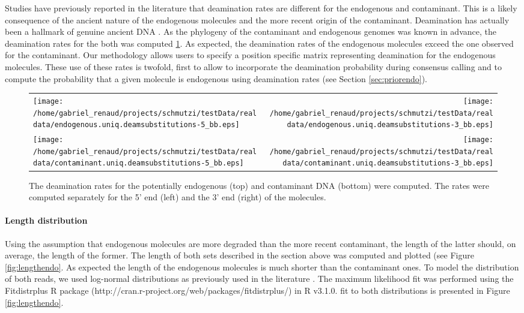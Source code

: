 \documentclass[a4paper,12pt]{article}
\begin{document}
\begin{itemize}
\begin{itemize}
Studies have previously reported in the literature \cite{meyer2013mitochondrial} that deamination rates are different for the endogenous and contaminant. This is a likely consequence of the ancient nature of the endogenous molecules and the more recent origin of the contaminant. Deamination has actually been a hallmark of genuine ancient DNA \cite{cooper2000ancient}. As the phylogeny of the contaminant and endogenous genomes was known in advance, the deamination rates for the both was computed \ref{fig:deaminationendo}. As expected, the deamination rates of the endogenous molecules exceed the one observed for the contaminant. Our methodology allows users to specify a position specific matrix representing deamination for the endogenous molecules. These use of these rates is twofold, first to allow to incorporate the deamination probability during consensus calling and to compute the probability that a given molecule is endogenous using deamination rates (see Section \ref{sec:priorendo}). 

\begin{figure}[H]
\centering
\begin{tabular}{lr}
  \texttt{[image: /home/gabriel\_renaud/projects/schmutzi/testData/realdata/endogenous.uniq.deamsubstitutions-5\_bb.eps]} &
  \texttt{[image: /home/gabriel\_renaud/projects/schmutzi/testData/realdata/endogenous.uniq.deamsubstitutions-3\_bb.eps]}   \\
  \texttt{[image: /home/gabriel\_renaud/projects/schmutzi/testData/realdata/contaminant.uniq.deamsubstitutions-5\_bb.eps]} &
  \texttt{[image: /home/gabriel\_renaud/projects/schmutzi/testData/realdata/contaminant.uniq.deamsubstitutions-3\_bb.eps]}   \\
\end{tabular}
\caption{The deamination rates for the potentially endogenous (top) and contaminant DNA (bottom) were computed. The rates were computed separately for the 5' end (left) and the 3' end (right) of the molecules. }
\label{fig:deaminationendo}
\end{figure}


\noindent \paragraph{Length distribution}
\label{seq:lengthdistendo}


Using the assumption that endogenous molecules\cite{garcia2011fragmentation} are more degraded than the more recent contaminant, the length of the latter should, on average, the length of the former. The length of both sets described in the section above was computed and plotted (see Figure \ref{fig:lengthendo}.  As expected the length of the endogenous molecules is much shorter than the contaminant ones. To model the distribution of both reads, we used log-normal distributions as previously used in the literature \cite{renaud2014leehom}. The maximum likelihood fit was performed using the Fitdistrplus R package (http://cran.r-project.org/web/packages/fitdistrplus/) in R v3.1.0. fit to both distributions is presented in Figure \ref{fig:lengthendo}. 



\end{itemize}
\end{itemize}
\end{document}
